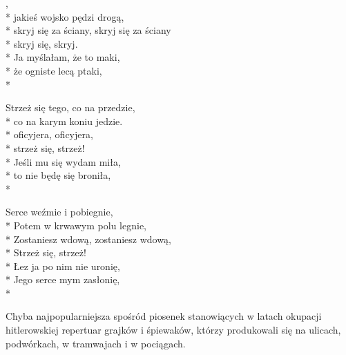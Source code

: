 
\begin{lyrics}[longestline={niech mnie zabiera, zabiera, zabiera.}]

,\\*
jakieś wojsko pędzi drogą,\\*
skryj się za ściany, skryj się za ściany\\*
skryj się, skryj.\\*
\vin Ja myślałam, że to maki,\\*
\vin że ogniste lecą ptaki,\\*

Strzeż się tego, co na przedzie,\\*
co na karym koniu jedzie.\\*
oficyjera, oficyjera,\\*
strzeż się, strzeż!\\*
\vin Jeśli mu się wydam miła,\\*
\vin to nie będę się broniła,\\*

Serce weźmie i pobiegnie,\\*
Potem w krwawym polu legnie,\\*
Zostaniesz wdową, zostaniesz wdową,\\*
Strzeż się, strzeż!\\*
\vin Łez ja po nim nie uronię,\\*
\vin Jego serce mym zasłonię,\\*
\end{lyrics}

\begin{info}Chyba najpopularniejsza spośród piosenek stanowiących w latach okupacji hitlerowskiej repertuar grajków i śpiewaków, którzy produkowali się na ulicach, podwórkach, w tramwajach i w pociągach. \end{info}

